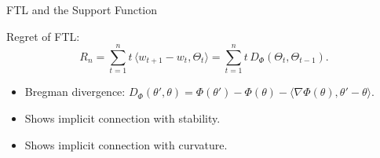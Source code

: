\documentclass[final]{beamer} %
\newcommand{\ip}[1]{\langle#1\rangle}
\begin{document}
\begin{frame}[c]
\begin{columns}[t,totalwidth=\textwidth]
\begin{column}{.32\textwidth}
\begin{block}{FTL and the Support Function}
			\begin{minipage}{.9\linewidth}
			\begin{alertblock}{Regret of FTL: }
				\vspace{-1cm}
				\[
				R_n = \sum_{t=1}^n t\,\ip{ w_{t+1}-w_t,\Theta_t} = \sum_{t=1}^{n} t\,D_{\Phi}(\Theta_t,\Theta_{t-1}).
				\]
				\begin{itemize}
					\item Bregman divergence: $D_{\Phi}(\theta', \theta) = \Phi(\theta') - \Phi(\theta) - \ip{ \nabla\Phi(\theta), \theta' - \theta}$.
					\item Shows implicit connection with stability.
					\item Shows implicit connection with curvature. 
				\end{itemize}
			\end{alertblock}
			\end{minipage}
		
		\end{block}



\end{column}
\end{columns}
\end{frame}
\end{document}
